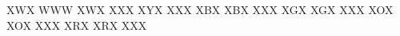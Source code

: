 \RubikFaceUp XWX WWW XWX
\RubikFaceDown XXX XYX XXX
\RubikFaceLeft XBX XBX XXX
\RubikFaceRight XGX XGX XXX
\RubikFaceFront XOX XOX XXX
\RubikFaceBack XRX XRX XXX